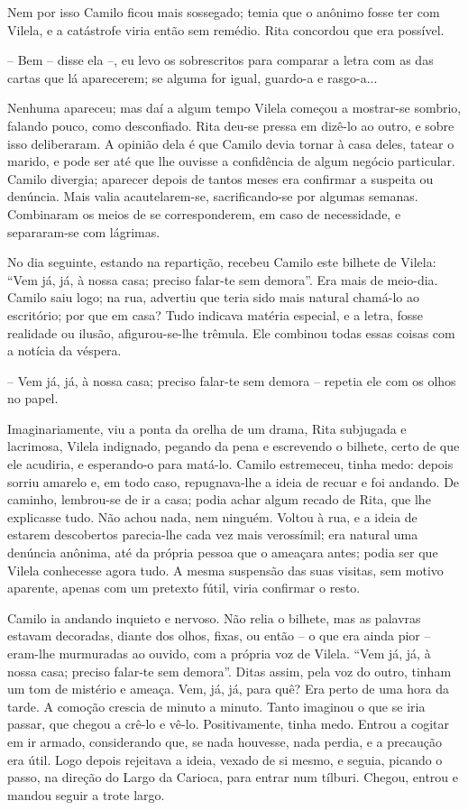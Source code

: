 Nem por isso Camilo ficou mais sossegado; temia que o anônimo fosse ter
com Vilela, e a catástrofe viria então sem remédio. Rita concordou que
era possível.

-- Bem -- disse ela --, eu levo os sobrescritos para comparar a letra
com as das cartas que lá aparecerem; se alguma for igual, guardo-a e
rasgo-a...

Nenhuma apareceu; mas daí a algum tempo Vilela começou a mostrar-se
sombrio, falando pouco, como desconfiado. Rita deu-se pressa em dizê-lo
ao outro, e sobre isso deliberaram. A opinião dela é que Camilo devia
tornar à casa deles, tatear o marido, e pode ser até que lhe ouvisse a
confidência de algum negócio particular. Camilo divergia; aparecer
depois de tantos meses era confirmar a suspeita ou denúncia. Mais valia
acautelarem-se, sacrificando-se por algumas semanas. Combinaram os meios
de se corresponderem, em caso de necessidade, e separaram-se com
lágrimas.

No dia seguinte, estando na repartição, recebeu Camilo este bilhete de
Vilela: ``Vem já, já, à nossa casa; preciso falar-te sem demora''. Era
mais de meio-dia. Camilo saiu logo; na rua, advertiu que teria sido mais
natural chamá-lo ao escritório; por que em casa? Tudo indicava matéria
especial, e a letra, fosse realidade ou ilusão, afigurou-se-lhe trêmula.
Ele combinou todas essas coisas com a notícia da véspera.

-- Vem já, já, à nossa casa; preciso falar-te sem demora -- repetia ele
com os olhos no papel.

Imaginariamente, viu a ponta da orelha de um drama, Rita subjugada e
lacrimosa, Vilela indignado, pegando da pena e escrevendo o bilhete,
certo de que ele acudiria, e esperando-o para matá-lo. Camilo
estremeceu, tinha medo: depois sorriu amarelo e, em todo caso,
repugnava-lhe a ideia de recuar e foi andando. De caminho, lembrou-se de
ir a casa; podia achar algum recado de Rita, que lhe explicasse tudo.
Não achou nada, nem ninguém. Voltou à rua, e a ideia de estarem
descobertos parecia-lhe cada vez mais verossímil; era natural uma
denúncia anônima, até da própria pessoa que o ameaçara antes; podia ser
que Vilela conhecesse agora tudo. A mesma suspensão das suas visitas,
sem motivo aparente, apenas com um pretexto fútil, viria confirmar o
resto.

Camilo ia andando inquieto e nervoso. Não relia o bilhete, mas as
palavras estavam decoradas, diante dos olhos, fixas, ou então -- o que
era ainda pior -- eram-lhe murmuradas ao ouvido, com a própria voz de
Vilela. ``Vem já, já, à nossa casa; preciso falar-te sem demora''. Ditas
assim, pela voz do outro, tinham um tom de mistério e ameaça. Vem, já,
já, para quê? Era perto de uma hora da tarde. A comoção crescia de
minuto a minuto. Tanto imaginou o que se iria passar, que chegou a
crê-lo e vê-lo. Positivamente, tinha medo. Entrou a cogitar em ir
armado, considerando que, se nada houvesse, nada perdia, e a precaução
era útil. Logo depois rejeitava a ideia, vexado de si mesmo, e seguia,
picando o passo, na direção do Largo da Carioca, para entrar num
tílburi. Chegou, entrou e mandou seguir a trote largo.

